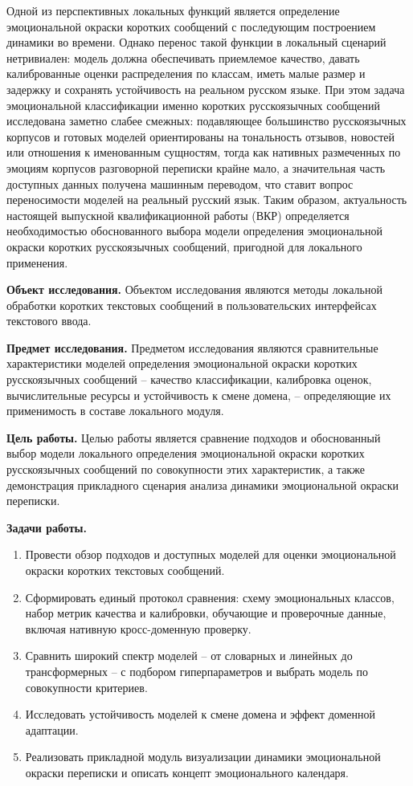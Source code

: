 \documentclass[12pt,a4paper]{report}
\begin{document}
Одной из перспективных локальных функций является определение эмоциональной окраски коротких сообщений с последующим построением динамики во времени. Однако перенос такой функции в локальный сценарий нетривиален: модель должна обеспечивать приемлемое качество, давать калиброванные оценки распределения по классам, иметь малые размер и задержку и сохранять устойчивость на реальном русском языке. При этом задача эмоциональной классификации именно коротких русскоязычных сообщений исследована заметно слабее смежных: подавляющее большинство русскоязычных корпусов и готовых моделей ориентированы на тональность отзывов, новостей или отношения к именованным сущностям, тогда как нативных размеченных по эмоциям корпусов разговорной переписки крайне мало, а значительная часть доступных данных получена машинным переводом, что ставит вопрос переносимости моделей на реальный русский язык. Таким образом, актуальность настоящей выпускной квалификационной работы (ВКР) определяется необходимостью обоснованного выбора модели определения эмоциональной окраски коротких русскоязычных сообщений, пригодной для локального применения.

\textbf{Объект исследования.}
Объектом исследования являются методы локальной обработки коротких текстовых сообщений в пользовательских интерфейсах текстового ввода.

\textbf{Предмет исследования.}
Предметом исследования являются сравнительные характеристики моделей определения эмоциональной окраски коротких русскоязычных сообщений -- качество классификации, калибровка оценок, вычислительные ресурсы и устойчивость к смене домена, -- определяющие их применимость в составе локального модуля.

\textbf{Цель работы.}
Целью работы является сравнение подходов и обоснованный выбор модели локального определения эмоциональной окраски коротких русскоязычных сообщений по совокупности этих характеристик, а также демонстрация прикладного сценария анализа динамики эмоциональной окраски переписки.

\textbf{Задачи работы.}
\begin{enumerate}
  \item Провести обзор подходов и доступных моделей для оценки эмоциональной окраски коротких текстовых сообщений.
  \item Сформировать единый протокол сравнения: схему эмоциональных классов, набор метрик качества и калибровки, обучающие и проверочные данные, включая нативную кросс-доменную проверку.
  \item Сравнить широкий спектр моделей -- от словарных и линейных до трансформерных -- с подбором гиперпараметров и выбрать модель по совокупности критериев.
  \item Исследовать устойчивость моделей к смене домена и эффект доменной адаптации.
  \item Реализовать прикладной модуль визуализации динамики эмоциональной окраски переписки и описать концепт эмоционального календаря.
\end{enumerate}
\end{document}
